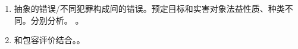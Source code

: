 \begin{enumerate}
\begin{enumerate}
\begin{enumerate}
                        \begin{enumerate}[resume*=l_after]
                          \item 抽象的错误/不同犯罪构成间的错误。预定目标和实害对象法益性质、种类不同。分别分析。
                                。
                          \item 和包容评价结合。。
                        \end{enumerate}
                \end{enumerate}
        \end{enumerate}
\end{enumerate}

